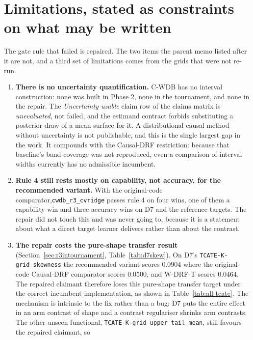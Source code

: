 \documentclass[11pt,a4paper]{article}
\theoremstyle{definition}
\theoremstyle{remark}
\newcommand{\CWDB}{\textsf{C-WDB}}
\begin{document}
\clearpage


\clearpage


\section{Limitations, stated as constraints on what may be written}

The gate rule that failed is repaired. The two items the parent memo listed after
it are not, and a third set of limitations comes from the grids that were not
re-run.

\begin{enumerate}
\item \textbf{There is no uncertainty quantification.} \CWDB{} has no interval
construction: none was built in Phase 2, none in the tournament, and none in the
repair. The \emph{Uncertainty usable} claim row of the claims matrix is
\emph{unevaluated}, not failed, and the estimand contract forbids substituting a
posterior draw of a mean surface for it. A distributional causal method without
uncertainty is not publishable, and this is the single largest gap in the work.
It compounds with the Causal-DRF restriction: because that baseline's band
coverage was not reproduced, even a comparison of interval widths currently has
no admissible incumbent.
\item \textbf{Rule 4 still rests mostly on capability, not accuracy, for the
recommended variant.} With the original-code comparator,\texttt{cwdb\_r3\_cvridge}
passes rule 4 on four wins, one of them a capability win and three accuracy wins
on D7 and the reference targets. The repair did not touch this and was never
going to, because it is a statement about what a direct target learner delivers
rather than about the contrast.
\item \textbf{The repair costs the pure-shape transfer result}
(Section~\ref{sec:r3intournament}, Table~\ref{tab:d7skew}). On D7's
\texttt{TCATE-K-grid\_skewness} the recommended variant scores $0.0904$ where the
original-code Causal-DRF comparator scores $0.0500$, and W-DRF-T scores $0.0464$.
The repaired claimant therefore loses this pure-shape transfer target under the
correct incumbent implementation, as shown in Table~\ref{tab:all-tcate}.
The mechanism is intrinsic to the fix rather than a bug: D7 puts the entire
effect in an arm contrast of shape and a contrast regulariser shrinks arm
contrasts. The other unseen functional,
\texttt{TCATE-K-grid\_upper\_tail\_mean}, still favours the repaired claimant, so

\end{enumerate}
\end{document}
